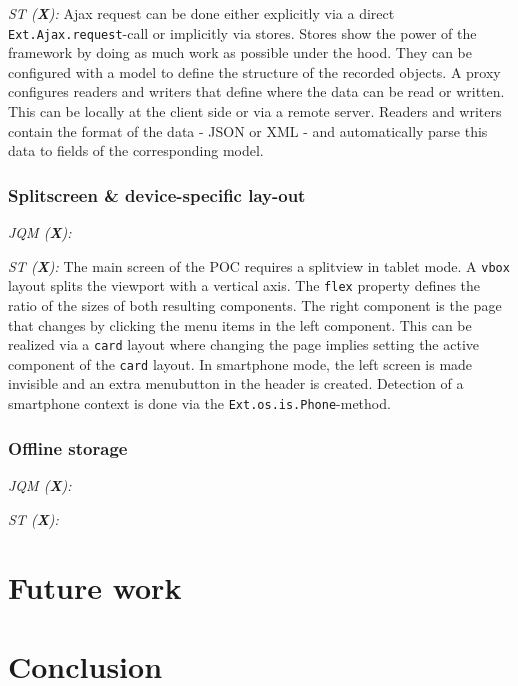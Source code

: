 \documentclass[a4paper]{artikel3}
\newcommand{\code}[1]{\texttt{#1}}
\newcommand{\framework}[2]{\emph{\MakeUppercase{#1} (\textbf{#2}): }} %
\begin{document}
\framework{ST}{X}
Ajax request can be done either explicitly via a direct \code{Ext.Ajax.request}-call or implicitly via stores.  Stores show the power of the framework by doing as much work as possible under the hood.  They can be configured with a model to define the structure of the recorded objects.  A proxy configures readers and writers that define where the data can be read or written.  This can be locally at the client side or via a remote server.  Readers and writers contain the format of the data - JSON or XML - and automatically parse this data to fields of the corresponding model. 

\subsubsection{Splitscreen \& device-specific lay-out}%
\framework{jQM}{X}

\framework{ST}{X}
The main screen of the POC requires a splitview in tablet mode.  A \code{vbox} layout splits the viewport with a vertical axis.  The \code{flex} property defines the ratio of the sizes of both resulting components.  The right component is the page that changes by clicking the menu items in the left component.  This can be realized via a \code{card} layout where changing the page implies setting the active component of the \code{card} layout.
In smartphone mode,  the left screen is made invisible and an extra menubutton in the header is created.  Detection of a smartphone context is done via the \code{Ext.os.is.Phone}-method.    

\subsubsection{Offline storage}
\framework{jQM}{X}

\framework{ST}{X}

\section{Future work} %
\label{sec:future_work}

\section{Conclusion} %
\label{sec:conclusion}



\end{document}
